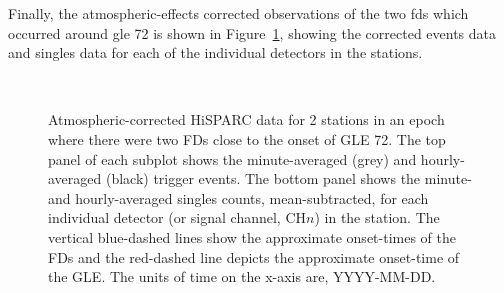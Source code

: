 Finally, the atmospheric-effects corrected observations of the two \glspl{fd} which occurred around \gls{gle} 72 is shown in Figure~\ref{fig:FD_GLE72_Pcorr}, showing the corrected events data and singles data for each of the individual detectors in the stations.

\begin{figure}[ht!]
	\centering
	 \\
	
	
	\caption{Atmospheric-corrected HiSPARC data for 2 stations in an epoch where there were two FDs close to the onset of GLE 72. The top panel of each subplot shows the minute-averaged (grey) and hourly-averaged (black) trigger events. The bottom panel shows the minute- and hourly-averaged singles counts, mean-subtracted, for each individual detector (or signal channel, CH$n$) in the station. The vertical blue-dashed lines show the approximate onset-times of the FDs and the red-dashed line depicts the approximate onset-time of the GLE. The units of time on the x-axis are, YYYY-MM-DD.}
	\label{fig:FD_GLE72_Pcorr}
\end{figure}


